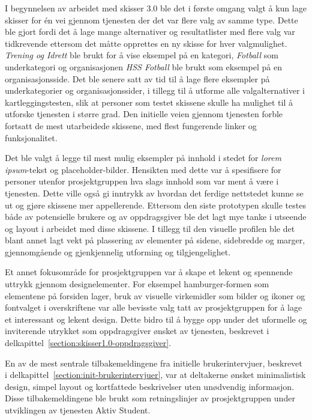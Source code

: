 I begynnelsen av arbeidet med skisser 3.0 ble det i første omgang valgt å kun lage skisser for én vei gjennom tjenesten der det var flere valg av samme type. Dette ble gjort fordi det å lage mange alternativer og resultatlister med flere valg var tidkrevende ettersom det måtte opprettes en ny skisse for hver valgmulighet. {\em  Trening og Idrett} ble brukt for å vise eksempel på en kategori, {\em  Fotball} som underkategori og organisasjonen {\em  HSS Fotball} ble brukt som eksempel på en organisasjonsside. Det ble senere satt av tid til å lage flere eksempler på underkategorier og organisasjonssider, i tillegg til å utforme alle valgalternativer i kartleggingstesten, slik at personer som testet skissene skulle ha mulighet til å utforske tjenesten i større grad. Den initielle veien gjennom tjenesten forble fortsatt de mest utarbeidede skissene, med flest fungerende linker og funksjonalitet.

Det ble valgt å legge til mest mulig eksempler på innhold i stedet for {\em  lorem ipsum}-tekst og placeholder-bilder. Hensikten med dette var å spesifisere for personer utenfor prosjektgruppen hva slags innhold som var ment å være i tjenesten. Dette ville også gi inntrykk av hvordan det ferdige nettstedet kunne se ut og gjøre skissene mer appellerende. Ettersom den siste prototypen skulle testes både av potensielle brukere og av oppdragsgiver ble det lagt mye tanke i utseende og layout i arbeidet med disse skissene. I tillegg til den visuelle profilen ble det blant annet lagt vekt på plassering av elementer på sidene, sidebredde og marger, gjennomgående og gjenkjennelig utforming og tilgjengelighet. 

Et annet fokusområde for prosjektgruppen var å skape et lekent og spennende uttrykk gjennom designelementer. For eksempel hamburger-formen som elementene på forsiden lager, bruk av visuelle virkemidler som bilder og ikoner og fontvalget i overskriftene var alle bevisste valg tatt av prosjektgruppen for å lage et interessant og lekent design. Dette bidro til å bygge opp under det uformelle og inviterende utrykket som oppdragsgiver ønsket av tjenesten, beskrevet i delkapittel~\ref{section:skisser1.0-oppdragsgiver}.

En av de mest sentrale tilbakemeldingene fra initielle brukerintervjuer, beskrevet i delkapittel~\ref{section:init-brukerintervjuer}, var at deltakerne ønsket minimalistisk design, simpel layout og kortfattede beskrivelser uten unødvendig informasjon. Disse tilbakemeldingene ble brukt som retningslinjer av prosjektgruppen under utviklingen av tjenesten Aktiv Student. 

